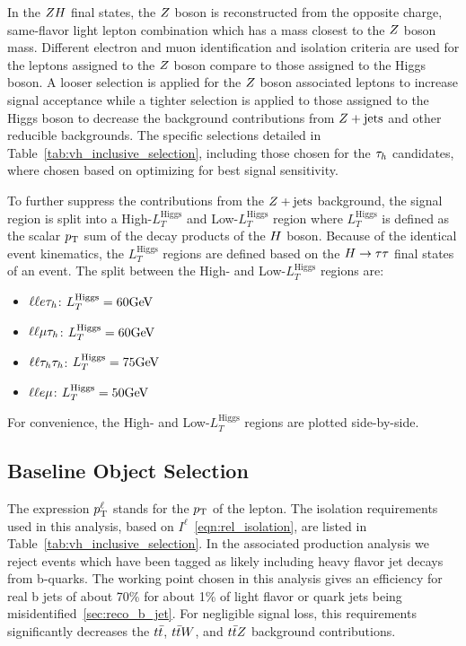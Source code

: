 In the $ZH$ final states, the $Z$ boson is reconstructed from the opposite charge, same-flavor
light lepton combination which has a mass closest to the $Z$ boson mass. Different 
electron and muon identification and isolation criteria are used for the leptons 
assigned to the $Z$ boson compare to those assigned to the Higgs boson. A looser
selection is applied for the $Z$ boson associated leptons to increase signal acceptance
while a tighter selection is applied to those assigned to the Higgs boson to
decrease the background contributions from $Z+\textrm{jets}$ and other reducible
backgrounds. The specific selections detailed in Table~\ref{tab:vh_inclusive_selection},
including those chosen for the $\tau_{h}$ candidates, where chosen based on 
optimizing for best signal sensitivity.

To further suppress the contributions from the $Z+\textrm{jets}$ background, the signal 
region is split into a High-$L_{T}^{\textrm{Higgs}}$ and Low-$L_{T}^{\textrm{Higgs}}$
region where $L_{T}^{\textrm{Higgs}}$ is defined as the scalar $p_\mathrm{T}$ sum of the decay 
products of the $H$ boson. Because of the identical event kinematics, the 
$L_{T}^{\textrm{Higgs}}$ regions are defined based on the $H\to\tau\tau$ final 
states of an event. The split between the High- and Low-$L_{T}^{\textrm{Higgs}}$
regions are:
\begin{itemize}
\item $\ell\ell e\tau_{h}$: $L_{T}^{\textrm{Higgs}} = 60\mathrm{GeV}$
\item $\ell\ell\mu\tau_{h}$: $L_{T}^{\textrm{Higgs}} = 60\mathrm{GeV}$
\item $\ell\ell\tau_{h}\tau_{h}$: $L_{T}^{\textrm{Higgs}} = 75\mathrm{GeV}$
\item $\ell\ell e\mu$: $L_{T}^{\textrm{Higgs}} = 50\mathrm{GeV}$
\end{itemize}
For convenience, the High- and Low-$L_{T}^{\textrm{Higgs}}$ regions are plotted
side-by-side.



\subsection{Baseline Object Selection}
\label{sec:vh_obj_selection}

The expression $p_\mathrm{T}^{\ell}$ stands for the $p_\mathrm{T}$ of the lepton. The isolation 
requirements used in this analysis, based on $I^{\ell}$~\ref{eqn:rel_isolation}, 
are listed in Table~\ref{tab:vh_inclusive_selection}.
In the associated production analysis we reject events which have been tagged as likely
including heavy flavor jet decays from b-quarks.
The working point chosen 
in this analysis gives an efficiency for real b jets of about 70\% for 
about 1\% of light flavor or quark jets being misidentified~\ref{sec:reco_b_jet}.
For negligible signal loss, this requirements significantly decreases the $t\bar{t}$,
$t\bar{t}W$, and $t\bar{t}Z$ background contributions.

